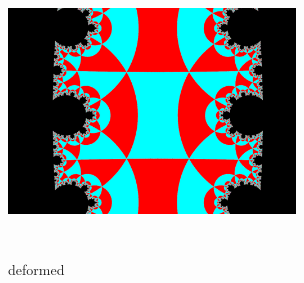 \begin{figure}[htbp]
 \begin{center}
      \includegraphics[width=3in, height=3in, keepaspectratio]{../img/tessellation/deformedTessellation.pdf}
    \caption{deformed}
    \label{fig:deformed}
 \end{center}
\end{figure}
